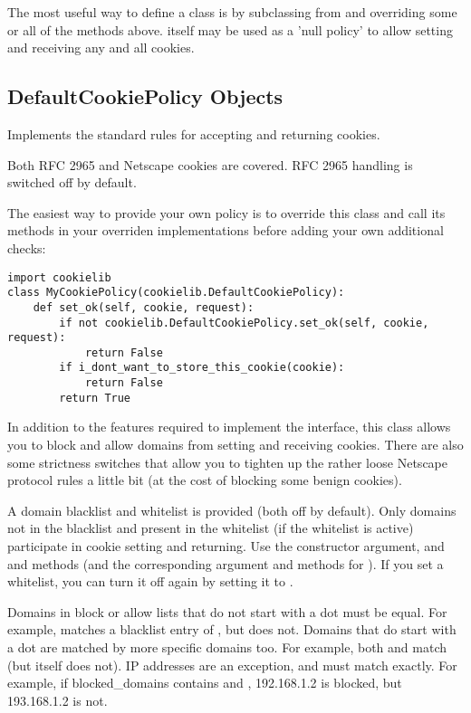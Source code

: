 The most useful way to define a  class is by
subclassing from  and overriding some or
all of the methods above.   itself may be used as
a 'null policy' to allow setting and receiving any and all cookies.


\subsection{DefaultCookiePolicy Objects \label{default-cookie-policy-objects}}

Implements the standard rules for accepting and returning cookies.

Both RFC 2965 and Netscape cookies are covered.  RFC 2965 handling is
switched off by default.

The easiest way to provide your own policy is to override this class
and call its methods in your overriden implementations before adding
your own additional checks:

\begin{verbatim}
import cookielib
class MyCookiePolicy(cookielib.DefaultCookiePolicy):
    def set_ok(self, cookie, request):
        if not cookielib.DefaultCookiePolicy.set_ok(self, cookie, request):
            return False
        if i_dont_want_to_store_this_cookie(cookie):
            return False
        return True
\end{verbatim}

In addition to the features required to implement the
 interface, this class allows you to block and
allow domains from setting and receiving cookies.  There are also some
strictness switches that allow you to tighten up the rather loose
Netscape protocol rules a little bit (at the cost of blocking some
benign cookies).

A domain blacklist and whitelist is provided (both off by default).
Only domains not in the blacklist and present in the whitelist (if the
whitelist is active) participate in cookie setting and returning.  Use
the  constructor argument, and
 and  methods
(and the corresponding argument and methods for
).  If you set a whitelist, you can turn it off
again by setting it to .

Domains in block or allow lists that do not start with a dot must be
equal.  For example,  matches a blacklist entry of
, but  does not.  Domains
that do start with a dot are matched by more specific domains too.
For example, both  and
 match  (but
 itself does not).  IP addresses are an exception,
and must match exactly.  For example, if blocked_domains contains
 and , 192.168.1.2 is blocked,
but 193.168.1.2 is not.

